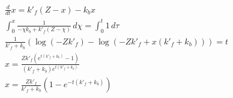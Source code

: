 \begin{align}
  \frac{d}{d t} x = k'_{f} \left(Z - x\right) - k_{b} x \\
  \int_{0}^{x} \frac{1}{- \chi k_{b} + k'_{f} \left(Z - \chi\right)}\, d\chi = \int_{0}^{t} 1\, d\tau \\
  \frac{1}{k'_{f} + k_{b}} \left(\log{\left (- Z k'_{f} \right )} - \log{\left (- Z k'_{f} + x \left(k'_{f} + k_{b}\right) \right )}\right) = t \\
  x = \frac{Z k'_{f} \left(e^{t \left(k'_{f} + k_{b}\right)} - 1\right)}{\left(k'_{f} + k_{b}\right) e^{t \left(k'_{f} + k_{b}\right)}} \\
  x = \frac{Z k'_{f}}{k'_{f} + k_{b}} \left(1 - e^{- t \left(k'_{f} + k_{b}\right)}\right)
\end{align}
